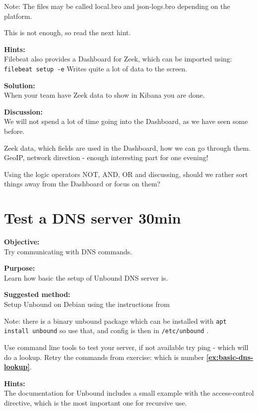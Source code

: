 \documentclass[a4paper,11pt,notitlepage]{report}
\begin{document}
Note: The files may be called local.bro and json-logs.bro depending on the platform.

This is not enough, so read the next hint.

{\bf Hints:}\\
Filebeat also provides a Dashboard for Zeek, which can be imported using:\\
\verb+filebeat setup -e+
Writes quite a lot of data to the screen.


{\bf Solution:}\\
When your team have Zeek data to show in Kibana you are done.

{\bf Discussion:}\\
We will not spend a lot of time going into the Dashboard, as we have seen some before.

Zeek data, which fields are used in the Dashboard, how we can go through them. GeoIP, network direction - enough interesting part for one evening!

Using the logic operators NOT, AND, OR and discussing, should we rather sort things away from the Dashboard or focus on them?



\chapter{Test a DNS server 30min}
\label{ex:dns-server-test}

{\bf Objective:}\\
Try communicating with DNS commands.

{\bf Purpose:}\\
Learn how basic the setup of Unbound DNS server is.

{\bf Suggested method:}\\
Setup Unbound on Debian using the instructions from\\

Note: there is a binary unbound package which can be installed with \verb+apt install unbound+ so use that, and config is then in \verb+/etc/unbound+ .

Use command line tools to test your server, if not available try ping - which will do a lookup. Retry the commands from exercise: {\bf {}}
which is number {\bf \ref{ex:basic-dns-lookup}}.

{\bf Hints:}\\
The documentation for Unbound includes a small example with the access-control directive, which is the most important one for recursive use.
\end{document}
